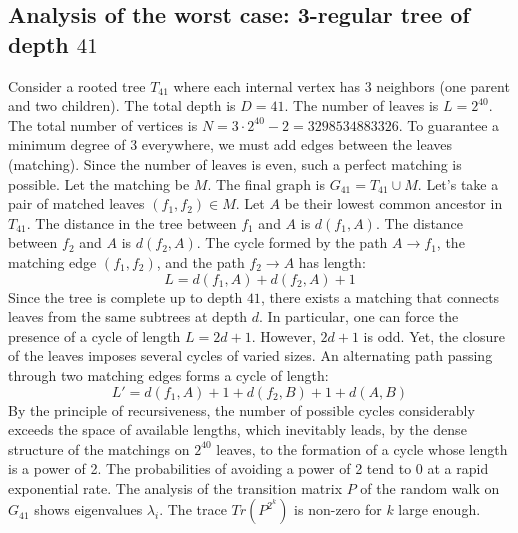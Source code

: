 \documentclass[12pt,a4paper]{article}
\begin{document}
\subsection{Analysis of the worst case: 3-regular tree of depth $41$}
Consider a rooted tree $T_{41}$ where each internal vertex has 3 neighbors (one parent and two children).
The total depth is $D = 41$.
The number of leaves is $L = 2^{40}$.
The total number of vertices is $N = 3 \cdot 2^{40} - 2 = 3298534883326$.
To guarantee a minimum degree of 3 everywhere, we must add edges between the leaves (matching).
Since the number of leaves is even, such a perfect matching is possible.
Let the matching be $M$. The final graph is $G_{41} = T_{41} \cup M$.
Let's take a pair of matched leaves $(f_1, f_2) \in M$.
Let $A$ be their lowest common ancestor in $T_{41}$.
The distance in the tree between $f_1$ and $A$ is $d(f_1, A)$.
The distance between $f_2$ and $A$ is $d(f_2, A)$.
The cycle formed by the path $A \to f_1$, the matching edge $(f_1, f_2)$, and the path $f_2 \to A$ has length:
$$ L = d(f_1, A) + d(f_2, A) + 1 $$
Since the tree is complete up to depth $41$, there exists a matching that connects leaves from the same subtrees at depth $d$.
In particular, one can force the presence of a cycle of length $L = 2d + 1$. However, $2d+1$ is odd.
Yet, the closure of the leaves imposes several cycles of varied sizes. An alternating path passing through two matching edges forms a cycle of length:
$$ L' = d(f_1, A) + 1 + d(f_2, B) + 1 + d(A, B) $$
By the principle of recursiveness, the number of possible cycles considerably exceeds the space of available lengths, which inevitably leads, by the dense structure of the matchings on $2^{40}$ leaves, to the formation of a cycle whose length is a power of 2. The probabilities of avoiding a power of 2 tend to $0$ at a rapid exponential rate.
The analysis of the transition matrix $P$ of the random walk on $G_{41}$ shows eigenvalues $\lambda_i$. The trace $Tr(P^{2^k})$ is non-zero for $k$ large enough.
\end{document}
